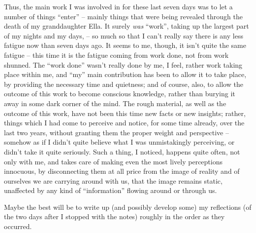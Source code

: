 Thus, the main work I was involved in for these last seven days was to
let a number of things ``enter'' -- mainly things that were being
revealed through the death of my granddaughter Ella. It surely
\emph{was} ``work'', taking up the largest part of my nights and my
days, -- so much so that I can't really say there is any less fatigue
now than seven days ago. It seems to me, though, it isn't quite the
same fatigue -- this time it is the fatigue coming from work done, not
from work shunned. The ``work done'' wasn't really done by me, I feel,
rather work taking place within me, and ``my'' main contribution has
been to allow it to take place, by providing the necessary time and
quietness; and of course, also, to allow the outcome of this work to
become conscious knowledge, rather than burying it away in some dark
corner of the mind. The rough material, as well as the outcome of this
work, have not been this time new facts or new insights; rather,
things which I had come to perceive and notice, for some time already,
over the last two years, without granting them the proper weight and
perspective -- somehow as if I didn't quite believe what I was
unmistakingly perceiving, or didn't take it quite seriously. Such a
thing, I noticed, happens quite often, not only with me, and takes
care of making even the most lively perceptions innocuous, by
disconnecting them at all price from the image of reality and of
ourselves we are carrying around with us, that the image remains
static, unaffected by any kind of ``information'' flowing around or
through us.

\bigbreak

\presectionfill{}

\label{sec:117}%
Maybe the best will be to write up (and possibly develop some) my
reflections (of the two days after I stopped with the notes) roughly
in the order as they occurred.

